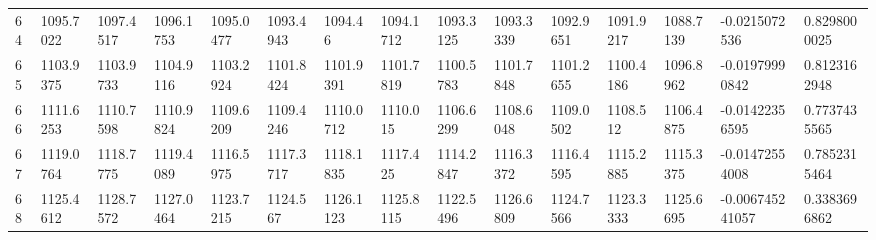 \begin{landscape}
{\begin{longtable}{@{}lllllllllllllll@{}}
		64                                           & 1095.7022                & 1097.4517                & 1096.1753                & 1095.0477                & 1093.4943                & 1094.46                  & 1094.1712                & 1093.3125                & 1093.3339                & 1092.9651                & 1091.9217                & 1088.7139                & -0.0215072536                                                          & 0.8298000025                                    \\
		65                                           & 1103.9375                & 1103.9733                & 1104.9116                & 1103.2924                & 1101.8424                & 1101.9391                & 1101.7819                & 1100.5783                & 1101.7848                & 1101.2655                & 1100.4186                & 1096.8962                & -0.01979990842                                                         & 0.8123162948                                    \\
		66                                           & 1111.6253                & 1110.7598                & 1110.9824                & 1109.6209                & 1109.4246                & 1110.0712                & 1110.015                 & 1106.6299                & 1108.6048                & 1109.0502                & 1108.512                 & 1106.4875                & -0.01422356595                                                         & 0.7737435565                                    \\
		67                                           & 1119.0764                & 1118.7775                & 1119.4089                & 1116.5975                & 1117.3717                & 1118.1835                & 1117.425                 & 1114.2847                & 1116.3372                & 1116.4595                & 1115.2885                & 1115.3375                & -0.01472554008                                                         & 0.7852315464                                    \\
		68                                           & 1125.4612                & 1128.7572                & 1127.0464                & 1123.7215                & 1124.567                 & 1126.1123                & 1125.8115                & 1122.5496                & 1126.6809                & 1124.7566                & 1123.3333                & 1125.6695                & -0.006745241057                                                        & 0.3383696862                                    \\

\end{longtable}}
\end{landscape}
